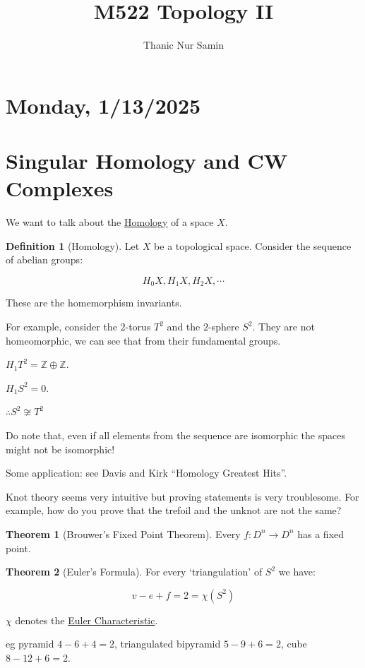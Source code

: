 \documentclass{article}
\title{M522 Topology II}
\author{Thanic Nur Samin}
\date{\vspace{-5ex}}
\theoremstyle{definition}
\newtheorem*{definition}{Definition}
\newtheorem{theorem}{Theorem}
\begin{document}
    \maketitle

    \section*{Monday, 1/13/2025}
    
    \section*{Singular Homology and CW Complexes}

    We want to talk about the \underline{Homology} of a space \(X\).

    \begin{definition}
        [Homology] Let \(X\) be a topological space. Consider the sequence of abelian groups:

        \[
            H_0 X, H_1 X, H_2 X, \cdots 
        \]

        These are the homemorphism invariants.

    \end{definition}

    For example, consider the \(2\)-torus \(T^2\) and the \(2\)-sphere \(S^2\). They are not homeomorphic, we can see that from their fundamental groups.


    \(H_1 T^2 = \mathbb{Z} \oplus \mathbb{Z}\).

    \(H_1 S^2 = 0\).

    \(\therefore S^2 \not\cong T^2\) 

    Do note that, even if all elements from the sequence are isomorphic the spaces might not be isomorphic!

    Some application: see Davis and Kirk ``Homology Greatest Hits''.

    Knot theory seems very intuitive but proving statements is very troublesome. For example, how do you prove that the trefoil and the unknot are not the same?

    \begin{theorem}
        [Brouwer's Fixed Point Theorem] Every \(f:D^n \to D^n\) has a fixed point.
    \end{theorem}

    \begin{theorem}
        [Euler's Formula] For every `triangulation' of \(S^2\) we have:

        \[
            v - e + f = 2 = \chi(S^2)
        \]

        \(\chi\) denotes the \underline{Euler Characteristic}.

        eg pyramid \(4-6+4=2\), triangulated bipyramid \(5-9+6 = 2\), cube \(8-12+6=2\).

    \end{theorem}
\end{document}
